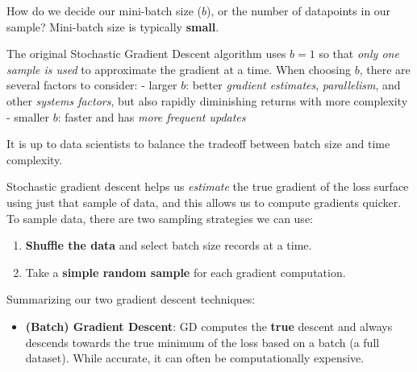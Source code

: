 \documentclass[
  letterpaper,
  DIV=11,
  numbers=noendperiod]{scrreprt}
\providecommand{\tightlist}{%
  \setlength{\itemsep}{0pt}\setlength{\parskip}{0pt}}\usepackage{longtable,booktabs,array}
\begin{document}
\begin{tcolorbox}[enhanced jigsaw, titlerule=0mm, bottomtitle=1mm, arc=.35mm, colframe=quarto-callout-tip-color-frame, rightrule=.15mm, opacityback=0, opacitybacktitle=0.6, leftrule=.75mm, breakable, toprule=.15mm, colback=white, left=2mm, colbacktitle=quarto-callout-tip-color!10!white, toptitle=1mm, bottomrule=.15mm, title=\textcolor{quarto-callout-tip-color}{\faLightbulb}\hspace{0.5em}{Tip}, coltitle=black]

How do we decide our mini-batch size (\(b\)), or the number of
datapoints in our sample? Mini-batch size is typically \textbf{small}.

The original Stochastic Gradient Descent algorithm uses \(b=1\) so that
\emph{only one sample is used} to approximate the gradient at a time.
When choosing \(b\), there are several factors to consider: - larger
\(b\): better \emph{gradient estimates}, \emph{parallelism}, and other
\emph{systems factors}, but also rapidly diminishing returns with more
complexity - smaller \(b\): faster and has \emph{more frequent updates}

It is up to data scientists to balance the tradeoff between batch size
and time complexity.

Stochastic gradient descent helps us \emph{estimate} the true gradient
of the loss surface using just that sample of data, and this allows us
to compute gradients quicker. To sample data, there are two sampling
strategies we can use:

\begin{enumerate}
\def\labelenumi{\arabic{enumi}.}
\tightlist
\item
  \textbf{Shuffle the data} and select batch size records at a time.
\item
  Take a \textbf{simple random sample} for each gradient computation.
\end{enumerate}

\end{tcolorbox}

Summarizing our two gradient descent techniques:

\begin{itemize}
\tightlist
\item
  \textbf{(Batch) Gradient Descent}: GD computes the \textbf{true}
  descent and always descends towards the true minimum of the loss based
  on a batch (a full dataset). While accurate, it can often be
  computationally expensive.
\end{itemize}
\end{document}
